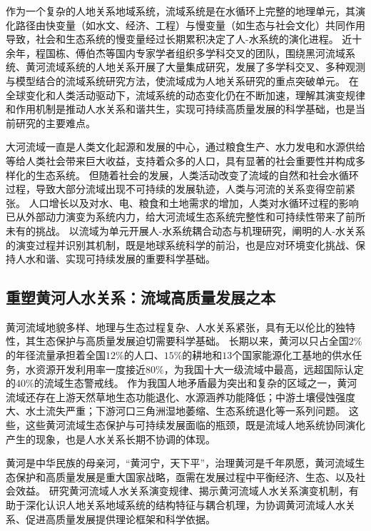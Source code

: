 作为一个复杂的人地关系地域系统，流域系统是在水循环上完整的地理单元，其演化路径由快变量（如水文、经济、工程）与慢变量（如生态与社会文化）共同作用导致，社会和生态系统的慢变量经过长期累积决定了人-水系统的演化进程\cite{falkenmark2021}。
近十余年，程国栋、傅伯杰等国内专家学者组织多学科交叉的团队，围绕黑河流域系统、黄河流域系统的人地关系开展了大量集成研究，发展了多学科交叉、多种观测与模型结合的流域系统研究方法，使流域成为人地关系研究的重点突破单元\cite{cheng2014, fu2021a}。
在全球变化和人类活动驱动下，流域系统的动态变化仍在不断加速，理解其演变规律和作用机制是推动人水关系和谐共生，实现可持续高质量发展的科学基础，也是当前研究的主要难点\cite{reyers2018}。

大河流域一直是人类文化起源和发展的中心，通过粮食生产、水力发电和水源供给等给人类社会带来巨大收益，支持着众多的人口，具有显著的社会重要性并构成多样化的生态系统\cite{best2019}。
但随着社会的发展，人类活动改变了流域的自然和社会水循环过程，导致大部分流域出现不可持续的发展轨迹，人类与河流的关系变得空前紧张\cite{best2019, best2020}。
人口增长以及对水、电、粮食和土地需求的增加\cite{crutzen2006}，人类对水循环过程的影响已从外部动力演变为系统内力，给大河流域生态系统完整性和可持续性带来了前所未有的挑战\cite{dibaldassarre2019}。
以流域为单元开展人-水系统耦合动态与机理研究，阐明的人-水关系的演变过程并识别其机制，既是地球系统科学的前沿，也是应对环境变化挑战、保持人水和谐、实现可持续发展的重要科学基础。

\subsection{重塑黄河人水关系：流域高质量发展之本}

黄河流域地貌多样、地理与生态过程复杂、人水关系紧张，具有无以伦比的独特性，其生态保护与高质量发展迫切需要科学基础。
长期以来，黄河以只占全国$2\%$的年径流量承担着全国$12\%$的人口、$15\%$的耕地和$13$个国家能源化工基地的供水任务，水资源开发利用率一度接近$80\%$，为我国十大一级流域中最高，远超国际认定的$40\%$的流域生态警戒线\cite{fu2021a}。
作为我国人地矛盾最为突出和复杂的区域之一，黄河流域还存在上游天然草地生态功能退化、水源涵养功能降低；中游土壤侵蚀强度大、水土流失严重；下游河口三角洲湿地萎缩、生态系统退化等一系列问题\cite{mazhuguo2020}。
这些，这些黄河流域生态保护与可持续发展面临的瓶颈，既是流域人地系统协同演化产生的现象，也是人水关系长期不协调的体现\cite{fu2021a}。

黄河是中华民族的母亲河，“黄河宁，天下平”，治理黄河是千年夙愿，黄河流域生态保护和高质量发展是重大国家战略，亟需在发展过程中平衡经济、生态、以及社会效益。
研究黄河流域人水关系演变规律、揭示黄河流域人水关系演变机制，有助于深化认识人地关系地域系统的结构特征与耦合机理，为协调黄河流域人水关系、促进高质量发展提供理论框架和科学依据。
